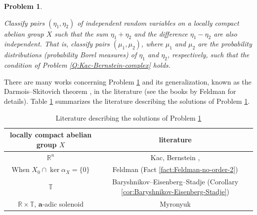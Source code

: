 \documentclass[12pt]{article}
\newtheorem{problem}[theorem]{Problem}
\theoremstyle{definition}
\theoremstyle{remark}
\numberwithin{equation}{section}
\numberwithin{figure}{section}
\numberwithin{table}{section}
\begin{document}
\begin{problem}
  \label{Q:Kac-Bernstein-probability-represent}

Classify pairs $ ( \eta_1 , \eta_2 ) $ of independent random variables on a locally compact abelian group $ X $ such that the sum $ \eta_1 + \eta_2 $ and the difference $ \eta_1 - \eta_2 $ are also independent.
That is, classify pairs $ ( \mu_1 , \mu_2 ) $, where $ \mu_1 $ and $ \mu_2 $ are the probability distributions (probability Borel measures) of $ \eta_1 $ and $ \eta_2 $, respectively, such that the condition of Problem \ref{Q:Kac-Bernstein-complex} holds.

\end{problem}

There are many works concerning Problem \ref{Q:Kac-Bernstein-probability-represent} and its generalization, known as the Darmois--Skitovich theorem \cite{MR61322} \cite{skitovitch1953property}, in the literature \cite{MR137201} \cite{MR144373} \cite{MR294997} \cite{MR1065592} \cite{MR1210054} \cite{MR1618734} \cite{MR1785533} \cite{MR1981634} \cite{MR2144871} \cite{MR2354566} \cite{MR2481995} \cite{MR3136462} \cite{MR2790886} \cite{MR3109683} \cite{MR3028778} \cite{MR3145890} \cite{MR3626791} \cite{MR3873044} (see the books \cite{MR1206473} \cite{MR2412878} \cite{MR4566375} by Feldman for details).
Table \ref{tab:Kac-Bernstein-reference} summarizes the literature describing the solutions of Problem \ref{Q:Kac-Bernstein-probability-represent}.

\begin{table}[ht]
            \centering
            \caption{Literature describing the solutions of Problem \ref{Q:Kac-Bernstein-probability-represent}}
            \label{tab:Kac-Bernstein-reference}

\vspace{8pt}
            
\begin{tabular}{c|c}
locally compact abelian group $ X $ & literature \\
\hline
$ \mathbb{ R }^n $ & Kac, Bernstein \cite{MR371}, \cite{bernstein1941property} \\
When $ X_0 \cap \ker \alpha_X = \{ 0 \} $ & Feldman (Fact \ref{fact:Feldman-no-order-2}) \\
$ \mathbb{ T } $ & Baryshnikov--Eisenberg--Stadje (Corollary \ref{cor:Baryshnikov-Eisenberg-Stadje}) \\
$ \mathbb{ R } \times \mathbb{ T } $, $ \mathbf{ a } $-adic solenoid & Myronyuk \cite[Theorems 1 and 2]{MR2214813}
\end{tabular}
\end{table}
\end{document}
